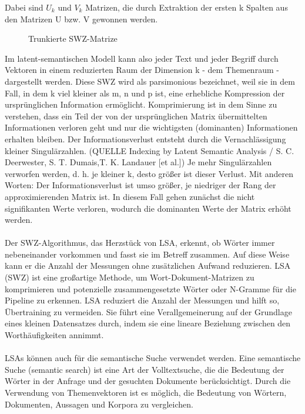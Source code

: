 Dabei sind $U_{k}$ und $V_{k}$ Matrizen, die durch Extraktion der ersten k Spalten aus den Matrizen U bzw. V gewonnen werden.
\begin{figure}[H]
    \centering
    \caption{\label{figure:Trun_SVD}Trunkierte \ac{SWZ}-Matrize}
\end{figure}
\noindent
Im latent-semantischen Modell kann also jeder Text und jeder Begriff durch Vektoren in einem reduzierten Raum der Dimension k - dem Themenraum - dargestellt werden. 
Diese \ac{SWZ} wird als parsimonious bezeichnet, weil sie in dem Fall, in dem k viel kleiner als m, n und p ist, eine erhebliche Kompression der ursprünglichen Information ermöglicht. 
Komprimierung ist in dem Sinne zu verstehen, dass ein Teil der von der ursprünglichen Matrix übermittelten Informationen verloren geht und nur die wichtigsten (dominanten) Informationen erhalten bleiben. 
Der Informationsverlust entsteht durch die Vernachlässigung kleiner Singulärzahlen. (QUELLE Indexing by Latent Semantic Analysis / S. C. Deerwester, S. T. Dumais,T. K. Landauer [et al.])
Je mehr Singulärzahlen verworfen werden, d. h. je kleiner k, desto größer ist dieser Verlust. 
Mit anderen Worten: Der Informationsverlust ist umso größer, je niedriger der Rang der approximierenden Matrix ist. 
In diesem Fall gehen zunächst die nicht signifikanten Werte verloren, wodurch die dominanten Werte der Matrix erhöht werden. \cite{lane_natural_2019}\\\\
Der \ac{SWZ}-Algorithmus, das Herzstück von \ac{LSA}, erkennt, ob Wörter immer nebeneinander vorkommen und fasst sie im Betreff zusammen. 
Auf diese Weise kann er die Anzahl der Messungen ohne zusätzlichen Aufwand reduzieren. 
\ac{LSA} (\ac{SWZ}) ist eine großartige Methode, um Wort-Dokument-Matrizen zu komprimieren und potenzielle zusammengesetzte Wörter oder N-Gramme für die Pipeline zu erkennen. 
\ac{LSA} reduziert die Anzahl der Messungen und hilft so, Übertraining zu vermeiden. 
Sie führt eine Verallgemeinerung auf der Grundlage eines kleinen Datensatzes durch, indem sie eine lineare Beziehung zwischen den Worthäufigkeiten annimmt.\cite{jurafsky_speech_2009}\\\\
\ac{LSA}s können auch für die semantische Suche verwendet werden. 
Eine semantische Suche (semantic search) ist eine Art der Volltextsuche, die die Bedeutung der Wörter in der Anfrage und der gesuchten Dokumente berücksichtigt. 
Durch die Verwendung von Themenvektoren ist es möglich, die Bedeutung von Wörtern, Dokumenten, Aussagen und Korpora zu vergleichen. 
